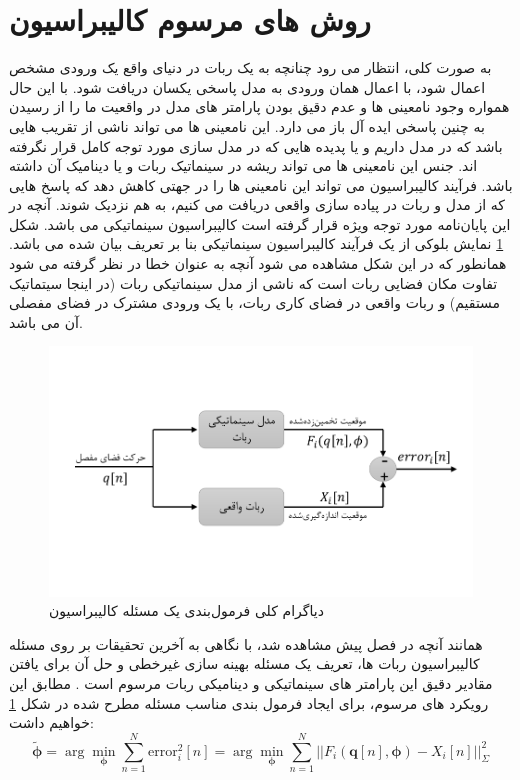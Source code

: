 \section{روش های مرسوم کالیبراسیون} \label{seq:conventional_calibration}
به صورت کلی، انتظار می رود چنانچه به یک ربات در دنیای واقع یک ورودی مشخص اعمال شود، با اعمال همان ورودی به مدل پاسخی یکسان دریافت شود. با این حال همواره وجود نامعینی ها و عدم دقیق بودن پارامتر های مدل در واقعیت ما را از رسیدن به چنین پاسخی ایده آل باز می دارد. این نامعینی ها می تواند ناشی از تقریب هایی باشد که در مدل داریم و یا پدیده هایی که در مدل سازی مورد توجه کامل قرار نگرفته اند. جنس این نامعینی ها می تواند ریشه در سینماتیک ربات و یا دینامیک آن داشته باشد. فرآیند کالیبراسیون می تواند این نامعینی ها را در جهتی کاهش دهد که پاسخ هایی که از مدل و ربات در پیاده سازی واقعی دریافت می کنیم، به هم نزدیک شوند. آنچه در این پایان‌نامه مورد توجه ویژه قرار گرفته است کالیبراسیون سینماتیکی می باشد. شکل \ref{fig:kinematicmodelerror} نمایش بلوکی از یک فرآیند کالیبراسیون سینماتیکی بنا بر تعریف بیان شده می باشد. همانطور که در این شکل مشاهده می شود آنچه به عنوان خطا در نظر گرفته می شود تفاوت مکان فضایی ربات است که ناشی از مدل سینماتیکی ربات (در اینجا سیتماتیک مستقیم) و ربات واقعی در فضای کاری ربات، با یک ورودی مشترک در فضای مفصلی آن می باشد. 

\begin{figure}[!t]
	\centering
	\includegraphics[width=0.8\linewidth, trim={0cm 2.2cm 0cm 2.2cm}, clip]{img/kinematic_model_error}
	\caption{دیاگرام کلی فرمول‌بندی یک مسئله کالیبراسیون}
	\label{fig:kinematicmodelerror}
\end{figure}


همانند آنچه در فصل پیش‌ مشاهده شد، با نگاهی به آخرین تحقیقات بر روی مسئله کالیبراسیون ربات ها، تعریف یک مسئله بهینه سازی غیرخطی و حل آن برای یافتن مقادیر دقیق این پارامتر های سینماتیکی و دینامیکی ربات مرسوم است
\cite{elatta2004overview,ida2019automatic,ida2022identification,ida2021dynamics}.
مطابق این رویکرد های مرسوم، برای ایجاد فرمول بندی مناسب مسئله مطرح شده در شکل \ref{fig:kinematicmodelerror} خواهیم داشت:
\begin{equation}\label{eq:optimization_equation_conventional}
	\tilde{\boldsymbol{\phi}} =  \arg\min_{\boldsymbol{\phi}} \sum_{n = 1 }^{N} \text{error}^2_i[n] = \arg\min_{\boldsymbol{\phi}} \sum_{n = 1}^{N} ||F_i(\boldsymbol{q}[n], \boldsymbol{\phi}) - X_i[n]||^2_{\Sigma}
\end{equation}


